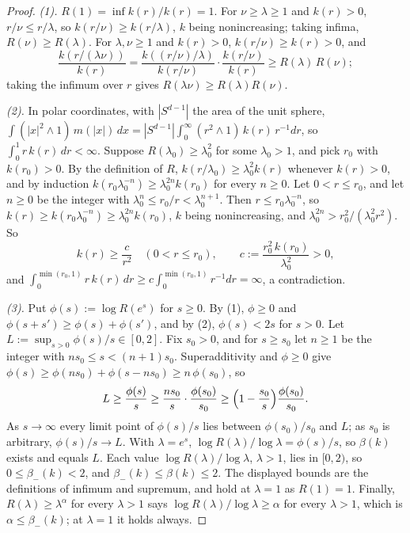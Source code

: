 \begin{proof}
\leanok
\emph{(1).} $R(1) = \inf k(r)/k(r) = 1$. For $\nu \ge \lambda \ge 1$ and $k(r) > 0$,
$r/\nu \le r/\lambda$, so $k(r/\nu) \ge k(r/\lambda)$, $k$ being nonincreasing; taking infima,
$R(\nu) \ge R(\lambda)$. For $\lambda, \nu \ge 1$ and $k(r) > 0$, $k(r/\nu) \ge k(r) > 0$, and
\[
  \frac{k(r/(\lambda\nu))}{k(r)} = \frac{k((r/\nu)/\lambda)}{k(r/\nu)}\cdot\frac{k(r/\nu)}{k(r)}
  \ge R(\lambda)\,R(\nu) ;
\]
taking the infimum over $r$ gives $R(\lambda\nu) \ge R(\lambda)R(\nu)$.

\emph{(2).} In polar coordinates, with $|S^{d-1}|$ the area of the unit sphere,
$\int(|x|^2 \wedge 1)\,m(|x|)\,dx = |S^{d-1}|\int_0^\infty(r^2 \wedge 1)\,k(r)\,r^{-1}dr$, so
$\int_0^1 r\,k(r)\,dr < \infty$. Suppose $R(\lambda_0) \ge \lambda_0^2$ for some $\lambda_0 > 1$, and pick
$r_0$ with $k(r_0) > 0$. By the definition of $R$, $k(r/\lambda_0) \ge \lambda_0^2k(r)$ whenever
$k(r) > 0$, and by induction $k(r_0\lambda_0^{-n}) \ge \lambda_0^{2n}k(r_0)$ for every $n \ge 0$. Let
$0 < r \le r_0$, and let $n \ge 0$ be the integer with $\lambda_0^n \le r_0/r < \lambda_0^{n+1}$. Then
$r \le r_0\lambda_0^{-n}$, so $k(r) \ge k(r_0\lambda_0^{-n}) \ge \lambda_0^{2n}k(r_0)$, $k$ being
nonincreasing, and $\lambda_0^{2n} > r_0^2/(\lambda_0^2r^2)$. So
\[
  k(r) \ge \frac{c}{r^2} \quad (0 < r \le r_0), \qquad c := \frac{r_0^2\,k(r_0)}{\lambda_0^2} > 0 ,
\]
and $\int_0^{\min(r_0, 1)} r\,k(r)\,dr \ge c\int_0^{\min(r_0, 1)}r^{-1}dr = \infty$, a contradiction.

\emph{(3).} Put $\phi(s) := \log R(e^s)$ for $s \ge 0$. By (1), $\phi \ge 0$ and
$\phi(s + s') \ge \phi(s) + \phi(s')$, and by (2), $\phi(s) < 2s$ for $s > 0$. Let
$L := \sup_{s>0}\phi(s)/s \in [0, 2]$. Fix $s_0 > 0$, and for $s \ge s_0$ let $n \ge 1$ be the integer
with $ns_0 \le s < (n+1)s_0$. Superadditivity and $\phi \ge 0$ give
$\phi(s) \ge \phi(ns_0) + \phi(s - ns_0) \ge n\,\phi(s_0)$, so
\[
  L \ge \frac{\phi(s)}{s} \ge \frac{ns_0}{s}\cdot\frac{\phi(s_0)}{s_0} \ge \Bigl(1 - \frac{s_0}{s}\Bigr)\frac{\phi(s_0)}{s_0} .
\]
As $s \to \infty$ every limit point of $\phi(s)/s$ lies between $\phi(s_0)/s_0$ and $L$; as $s_0$ is
arbitrary, $\phi(s)/s \to L$. With $\lambda = e^s$, $\log R(\lambda)/\log\lambda = \phi(s)/s$, so $\beta(k)$
exists and equals $L$. Each value $\log R(\lambda)/\log\lambda$, $\lambda > 1$, lies in $[0, 2)$, so
$0 \le \beta_-(k) < 2$, and $\beta_-(k) \le \beta(k) \le 2$. The displayed bounds are the definitions of
infimum and supremum, and hold at $\lambda = 1$ as $R(1) = 1$. Finally, $R(\lambda) \ge \lambda^\alpha$ for
every $\lambda > 1$ says $\log R(\lambda)/\log\lambda \ge \alpha$ for every $\lambda > 1$, which is
$\alpha \le \beta_-(k)$; at $\lambda = 1$ it holds always.


\end{proof}
